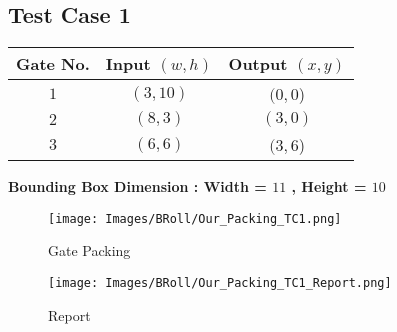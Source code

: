 \documentclass[12pt, a4paper,openany]{article}
\begin{document}
\subsection{Test Case 1}
\begin{center}
\begin{tabular}{|c|c|c|}
    \hline
    \rowcolor[HTML]{DAE8FC} Gate No. &
    Input \((w,h)\)                                    & Output \((x,y)\)   \\ \hline
    \rowcolor[HTML]{FFFC9E} {\color[HTML]{000000} \(1\)} &
    {\color[HTML]{000000} \((3,10)\)}                         & {\color[HTML]{000000} \((0,0\))}    \\ \hline
    \rowcolor[HTML]{FFFC9E} 
    {\color[HTML]{000000} \(2\)} &
    {\color[HTML]{000000} \((8,3)\)}                         & {\color[HTML]{000000} \((3,0)\)}      \\ \hline
     \rowcolor[HTML]{FFFC9E} 
     {\color[HTML]{000000} \(3\)} &
    {\color[HTML]{000000} \((6,6)\)}                         & {\color[HTML]{000000} \((3,6\))}      \\ \hline
    
\end{tabular}
\end{center}
\begin{center}
\textbf{Bounding Box Dimension : Width = \(11\) , Height = \(10\)}    
\end{center}
\begin{figure}[ht]
    \centering
    \begin{minipage}{.6\textwidth}
          \centering
          \texttt{[image: Images/BRoll/Our\_Packing\_TC1.png]}
          \label{fig:tc-1}
          \caption{Gate Packing }
      
          \texttt{[image: Images/BRoll/Our\_Packing\_TC1\_Report.png]}
          \label{fig:tcr-1}
          \caption{Report}
          \centering 
      \end{minipage}
    \end{figure}

    
\newpage
\end{document}
